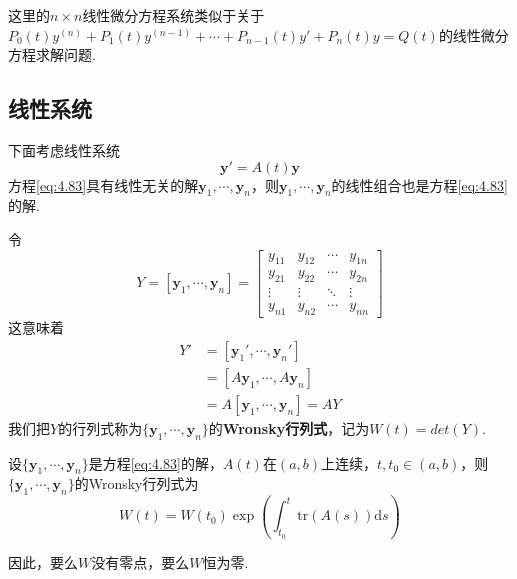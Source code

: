 \begin{remark}
    这里的$n\times n$线性微分方程系统类似于关于$P_0(t)y^{(n)}+P_1(t)y^{(n-1)}+\cdots+P_{n-1}(t)y'+P_n(t)y=Q(t)$的线性微分方程求解问题.
\end{remark}

\subsection{线性系统}

下面考虑线性系统
\begin{equation}\label{eq:4.83}
    \mathbf{y}'=A(t)\mathbf{y}
\end{equation}
方程\ref{eq:4.83}具有线性无关的解$\mathbf{y}_1,\cdots,\mathbf{y}_n$，则$\mathbf{y}_1,\cdots,\mathbf{y}_n$的线性组合也是方程\ref{eq:4.83}的解.

令
\[
    Y=[\mathbf{y}_1,\cdots,\mathbf{y}_n]=\begin{bmatrix}
        y_{11} & y_{12} & \cdots & y_{1n} \\
        y_{21} & y_{22} & \cdots & y_{2n} \\
        \vdots & \vdots & \ddots & \vdots \\
        y_{n1} & y_{n2} & \cdots & y_{nn}
    \end{bmatrix}
\]
这意味着
\begin{align*}
    Y' & =[\mathbf{y}_1',\cdots,\mathbf{y}_n']    \\
       & =[A\mathbf{y}_1,\cdots,A\mathbf{y}_n]    \\
       & =A [\mathbf{y}_1,\cdots,\mathbf{y}_n]=AY
\end{align*}
我们把$Y$的行列式称为$\{\mathbf{y}_1,\cdots,\mathbf{y}_n\}$的\textbf{Wronsky行列式}，记为$W(t)=det(Y)$.
\begin{theorem}\label{thm:4.8}
    设$\{\mathbf{y}_1,\cdots,\mathbf{y}_n\}$是方程\ref{eq:4.83}的解，$A(t)$在$(a,b)$上连续，$t,t_0\in(a,b)$，则$\{\mathbf{y}_1,\cdots,\mathbf{y}_n\}$的Wronsky行列式为
    \begin{equation}\label{eq:4.84}
        W(t)=W(t_0)\exp\left(\int_{t_0}^t \mathrm{tr}(A(s))\mathrm{d}s\right)
    \end{equation}
\end{theorem}
因此，要么$W$没有零点，要么$W$恒为零.
